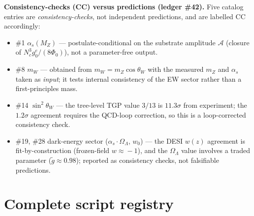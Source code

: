 \documentclass[aps,prd,twocolumn,superscriptaddress,showpacs,
  nofootinbib,floatfix,longbibliography]{revtex4-2}
\newcommand{\gone}{{g_0^e}}
\newcommand{\OL}{\Omega_\Lambda}
\newcommand{\as}{\alpha_s}
\newcommand{\PhiZero}{\Phi_0}
\newcommand{\MZ}{M_Z}
\begin{document}
\noindent\textbf{Consistency-checks (CC) versus predictions (ledger \#42).}
Five catalog entries are \emph{consistency-checks}, not independent
predictions, and are labelled CC accordingly:
\begin{itemize}
  \item \#1 $\as(\MZ)$ --- postulate-conditional on the substrate
    amplitude $\mathcal{A}$ (closure of $N_c^3\gone/(8\PhiZero)$),
    not a parameter-free output.
  \item \#8 $m_W$ --- obtained from $m_W = m_Z\cos\theta_W$ with the
    measured $m_Z$ and $\as$ taken as \emph{input}; it tests internal
    consistency of the EW sector rather than a first-principles mass.
  \item \#14 $\sin^2\theta_W$ --- the tree-level TGP value $3/13$ is
    $11.3\sigma$ from experiment; the $1.2\sigma$ agreement requires the
    QCD-loop correction, so this is a loop-corrected consistency check.
  \item \#19, \#28 dark-energy sector ($\as\cdot\OL$, $w_0$) --- the DESI
    $w(z)$ agreement is fit-by-construction (frozen-field
    $w\!\approx\!-1$), and the $\OL$ value involves a traded parameter
    ($\tilde g\approx0.98$); reported as consistency checks, not
    falsifiable predictions.
\end{itemize}


\section{Complete script registry}\label{app:scripts}
\end{document}
